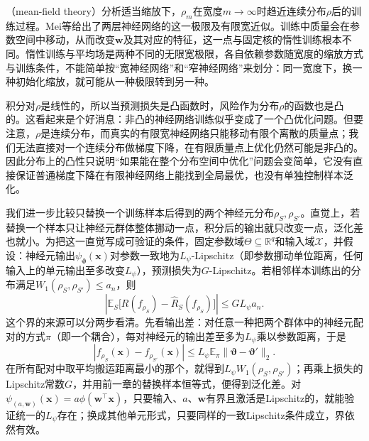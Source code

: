 （mean-field theory）分析适当缩放下，$\rho_m$在宽度$m\to\infty$时趋近连续分布$\rho$后的训练过程。Mei等给出了两层神经网络的这一极限及有限宽近似。训练中质量会在参数空间中移动，从而改变$\bm w$及其对应的特征，这一点与固定核的惰性训练根本不同。惰性训练与平均场是两种不同的无限宽极限，各自依赖参数随宽度的缩放方式与训练条件，不能简单按“宽神经网络”和“窄神经网络”来划分：同一宽度下，换一种初始化缩放，就可能从一种极限转到另一种。

积分对$\rho$是线性的，所以当预测损失是凸函数时，风险作为分布$\rho$的函数也是凸的。这看起来是个好消息：非凸的神经网络训练似乎变成了一个凸优化问题。但要注意，$\rho$是连续分布，而真实的有限宽神经网络只能移动有限个离散的质量点；我们无法直接对一个连续分布做梯度下降，在有限质量点上优化仍然可能是非凸的。因此分布上的凸性只说明“如果能在整个分布空间中优化”问题会变简单，它没有直接保证普通梯度下降在有限神经网络上能找到全局最优，也没有单独控制样本泛化。

我们进一步比较只替换一个训练样本后得到的两个神经元分布$\rho_S,\rho_{S'}$。直觉上，若替换一个样本只让神经元群体整体挪动一点，积分后的输出就只改变一点，泛化差也就小。为把这一直觉写成可验证的条件，固定参数域$\Theta\subseteq\mathbb R^q$和输入域$\mathcal X$，并假设：神经元输出$\psi_{\bm\vartheta}(\bm x)$对参数一致地为$L_\psi$-Lipschitz（即参数挪动单位距离，任何输入上的单元输出至多改变$L_\psi$），预测损失为$G$-Lipschitz。若相邻样本训练出的分布满足$W_1(\rho_S,\rho_{S'})\leq a_n$，则
\[
 \left|\mathbb E_S\bigl[R(f_{\rho_S})-\hat R_S(f_{\rho_S})\bigr]\right|
 \leq G L_\psi a_n.
\]
这个界的来源可以分两步看清。先看输出差：对任意一种把两个群体中的神经元配对的方式$\pi$（即一个耦合），每对神经元的输出差至多为$L_\psi$乘以参数距离，于是
\[
 |f_{\rho_S}(\bm x)-f_{\rho_{S'}}(\bm x)|
 \leq L_\psi\mathbb E_\pi\|\bm\vartheta-\bm\vartheta'\|_2.
\]
在所有配对中取平均搬运距离最小的那个，就得到$L_\psi W_1(\rho_S,\rho_{S'})$；再乘上损失的Lipschitz常数$G$，并用前一章的替换样本恒等式，便得到泛化差。对$\psi_{(a,\bm w)}(\bm x)=a\phi(\bm w^\top\bm x)$，只要输入、$a$、$\bm w$有界且激活是Lipschitz的，就能验证统一的$L_\psi$存在；换成其他单元形式，只要同样的一致Lipschitz条件成立，界依然有效。

